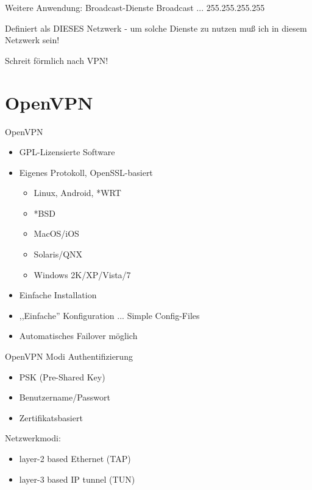 \documentclass{beamer}
\begin{document}
\begin{frame}{Weitere Anwendung: Broadcast-Dienste}
	Broadcast ... 255.255.255.255 

	Definiert als DIESES Netzwerk - um solche Dienste zu nutzen muß ich in diesem Netzwerk sein!

	\pause

	Schreit förmlich nach VPN!
\end{frame}

\section{OpenVPN}

\begin{frame}{OpenVPN}
\begin{itemize}
  \item GPL-Lizensierte Software
  \item Eigenes Protokoll, OpenSSL-basiert 
  \begin{itemize}
    \item Linux, Android, *WRT
    \item *BSD
    \item MacOS/iOS
    \item Solaris/QNX
    \item Windows 2K/XP/Vista/7
  \end{itemize}
  \item Einfache Installation
  \item ,,Einfache'' Konfiguration ... \pause Simple Config-Files
  \item Automatisches Failover möglich
\end{itemize}

\end{frame}

\begin{frame}{OpenVPN Modi}
	Authentifizierung
  \begin{itemize}
    \item PSK (Pre-Shared Key)
    \item Benutzername/Passwort
    \item Zertifikatsbasiert
  \end{itemize}
\pause
	Netzwerkmodi:
\begin{itemize}
	\item layer-2 based Ethernet (TAP)
	\item layer-3 based IP tunnel (TUN)
\end{itemize}

\end{frame}
\end{document}
